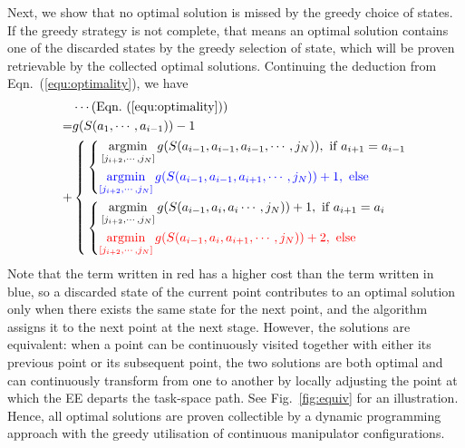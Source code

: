 \documentclass[letterpaper, 10 pt, conference]{ieeeconf}  %
\begin{document}
Next, we show that no optimal solution is missed by the greedy choice of states. 
If the greedy strategy is not complete, that means an optimal solution contains one of the discarded states by the greedy selection of state, which will be 
proven retrievable by the collected optimal solutions. Continuing the deduction from Eqn.~(\ref{equ:optimality}), we have 
\begin{equation}
\begin{aligned}
&\cdots (\mbox{Eqn.}~(\ref{equ:optimality}))\\
=&g(S(a_1, \cdots, a_{i-1})) - 1 \\
+&\left\{
\begin{aligned}
	&\left\{
	\begin{aligned}
		&\mathop{\rm argmin}\limits_{[j_{i+2}, \cdots, j_N]} g(S(a_{i-1}, a_{i-1}, a_{i-1}, \cdots, j_N)), \mbox{ if } a_{i+1}=a_{i-1}\\
		&{\color{blue}\mathop{\rm argmin}\limits_{[j_{i+2}, \cdots, j_N]} g(S(a_{i-1}, a_{i-1}, a_{i+1}, \cdots, j_N))+1, \mbox{ else }}
	\end{aligned}
	\right.\\
  &\left\{
	\begin{aligned}
		&\mathop{\rm argmin}\limits_{[j_{i+2}, \cdots, j_N]} g(S(a_{i-1}, a_i, a_i\cdots, j_N))+1, \mbox{ if }a_{i+1}= a_i\\
		&{\color{red}\mathop{\rm argmin}\limits_{[j_{i+2}, \cdots, j_N]} g(S(a_{i-1}, a_i, a_{i+1}, \cdots, j_N))+2, \mbox{ else }}
	\end{aligned}
	\right.
\end{aligned}
\right.
\end{aligned}
\end{equation}
Note that the term written in red has a higher cost than the term written in blue, so a discarded state of the current point contributes to an optimal solution only when there exists the same state for the next point, and the algorithm assigns it to the next point at the next stage. 
However, the solutions are equivalent: when a point can be continuously visited together with either its previous point or its subsequent point, the two solutions are both optimal and can continuously transform from one to another by locally adjusting the point at which the EE departs the task-space path.
See Fig.~\ref{fig:equiv} for an illustration. 
Hence, all optimal solutions are proven collectible by a dynamic programming approach with the greedy utilisation of continuous manipulator configurations. 
\end{document}
